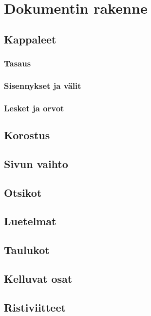 \chapter{Dokumentin rakenne}
\section{Kappaleet}
\label{luku:kappale}

\subsection{Tasaus}
\subsection{Sisennykset ja välit}
\subsection{Lesket ja orvot}
\section{Korostus}
\section{Sivun vaihto}
\section{Otsikot}


\section{Luetelmat}
\section{Taulukot}
\label{luku:taulukot}
\section{Kelluvat osat}
\section{Ristiviitteet}
